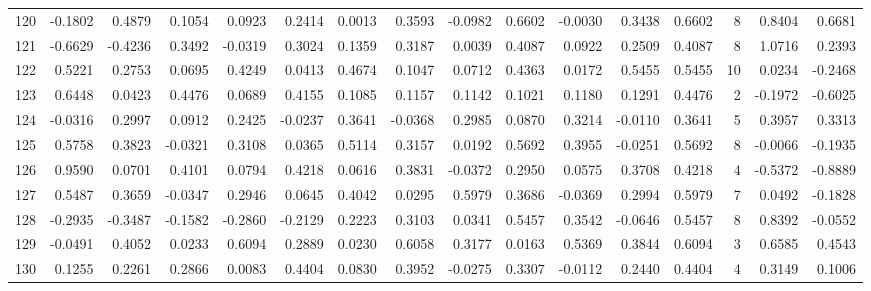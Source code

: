 \begin{tabular}{lrrrrrrrrrrrrrrr}
120 &     -0.1802 &  0.4879 &  0.1054 &  0.0923 &  0.2414 &  0.0013 &  0.3593 & -0.0982 &  0.6602 & -0.0030 &   0.3438 &     0.6602 &      8 &                    0.8404 &                     0.6681 \\
121 &     -0.6629 & -0.4236 &  0.3492 & -0.0319 &  0.3024 &  0.1359 &  0.3187 &  0.0039 &  0.4087 &  0.0922 &   0.2509 &     0.4087 &      8 &                    1.0716 &                     0.2393 \\
122 &      0.5221 &  0.2753 &  0.0695 &  0.4249 &  0.0413 &  0.4674 &  0.1047 &  0.0712 &  0.4363 &  0.0172 &   0.5455 &     0.5455 &     10 &                    0.0234 &                    -0.2468 \\
123 &      0.6448 &  0.0423 &  0.4476 &  0.0689 &  0.4155 &  0.1085 &  0.1157 &  0.1142 &  0.1021 &  0.1180 &   0.1291 &     0.4476 &      2 &                   -0.1972 &                    -0.6025 \\
124 &     -0.0316 &  0.2997 &  0.0912 &  0.2425 & -0.0237 &  0.3641 & -0.0368 &  0.2985 &  0.0870 &  0.3214 &  -0.0110 &     0.3641 &      5 &                    0.3957 &                     0.3313 \\
125 &      0.5758 &  0.3823 & -0.0321 &  0.3108 &  0.0365 &  0.5114 &  0.3157 &  0.0192 &  0.5692 &  0.3955 &  -0.0251 &     0.5692 &      8 &                   -0.0066 &                    -0.1935 \\
126 &      0.9590 &  0.0701 &  0.4101 &  0.0794 &  0.4218 &  0.0616 &  0.3831 & -0.0372 &  0.2950 &  0.0575 &   0.3708 &     0.4218 &      4 &                   -0.5372 &                    -0.8889 \\
127 &      0.5487 &  0.3659 & -0.0347 &  0.2946 &  0.0645 &  0.4042 &  0.0295 &  0.5979 &  0.3686 & -0.0369 &   0.2994 &     0.5979 &      7 &                    0.0492 &                    -0.1828 \\
128 &     -0.2935 & -0.3487 & -0.1582 & -0.2860 & -0.2129 &  0.2223 &  0.3103 &  0.0341 &  0.5457 &  0.3542 &  -0.0646 &     0.5457 &      8 &                    0.8392 &                    -0.0552 \\
129 &     -0.0491 &  0.4052 &  0.0233 &  0.6094 &  0.2889 &  0.0230 &  0.6058 &  0.3177 &  0.0163 &  0.5369 &   0.3844 &     0.6094 &      3 &                    0.6585 &                     0.4543 \\
130 &      0.1255 &  0.2261 &  0.2866 &  0.0083 &  0.4404 &  0.0830 &  0.3952 & -0.0275 &  0.3307 & -0.0112 &   0.2440 &     0.4404 &      4 &                    0.3149 &                     0.1006 \\

\end{tabular}
